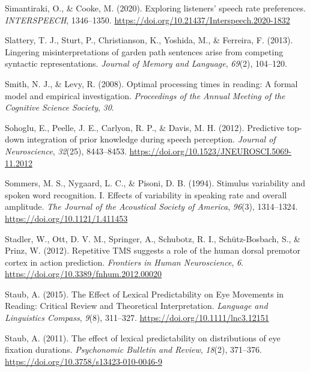 \documentclass[a4paper, nobind]{templates/ociamthesis}
\newlength{\cslhangindent}
\newenvironment{CSLReferences}[2] %
 {%
  \setlength{\parindent}{0pt}
  \ifodd #1
  \let\oldpar\par
  \def\par{\hangindent=\cslhangindent\oldpar}
  \fi
  \setlength{\parskip}{1mm}
  \setlength{\baselineskip}{6mm}
 }%
 {}
\begin{document}
\begin{CSLReferences}{1}{0}
\leavevmode{}%
Simantiraki, O., \& Cooke, M. (2020). {Exploring listeners' speech rate preferences}. \emph{INTERSPEECH}, 1346--1350. \url{https://doi.org/10.21437/Interspeech.2020-1832}

\leavevmode{}%
Slattery, T. J., Sturt, P., Christianson, K., Yoshida, M., \& Ferreira, F. (2013). Lingering misinterpretations of garden path sentences arise from competing syntactic representations. \emph{Journal of Memory and Language}, \emph{69}(2), 104--120.

\leavevmode{}%
Smith, N. J., \& Levy, R. (2008). Optimal processing times in reading: A formal model and empirical investigation. \emph{Proceedings of the Annual Meeting of the Cognitive Science Society}, \emph{30}.

\leavevmode{}%
Sohoglu, E., Peelle, J. E., Carlyon, R. P., \& Davis, M. H. (2012). {Predictive top-down integration of prior knowledge during speech perception}. \emph{Journal of Neuroscience}, \emph{32}(25), 8443--8453. \url{https://doi.org/10.1523/JNEUROSCI.5069-11.2012}

\leavevmode{}%
Sommers, M. S., Nygaard, L. C., \& Pisoni, D. B. (1994). Stimulus variability and spoken word recognition. I. Effects of variability in speaking rate and overall amplitude. \emph{The Journal of the Acoustical Society of America}, \emph{96}(3), 1314--1324. \url{https://doi.org/10.1121/1.411453}

\leavevmode{}%
Stadler, W., Ott, D. V. M., Springer, A., Schubotz, R. I., Schütz-Bosbach, S., \& Prinz, W. (2012). Repetitive TMS suggests a role of the human dorsal premotor cortex in action prediction. \emph{Frontiers in Human Neuroscience}, \emph{6}. \url{https://doi.org/10.3389/fnhum.2012.00020}

\leavevmode{}%
Staub, A. (2015). The Effect of Lexical Predictability on Eye Movements in Reading: Critical Review and Theoretical Interpretation. \emph{Language and Linguistics Compass}, \emph{9}(8), 311--327. \url{https://doi.org/10.1111/lnc3.12151}

\leavevmode{}%
Staub, A. (2011). {The effect of lexical predictability on distributions of eye fixation durations}. \emph{Psychonomic Bulletin and Review}, \emph{18}(2), 371--376. \url{https://doi.org/10.3758/s13423-010-0046-9}


\end{CSLReferences}
\end{document}
